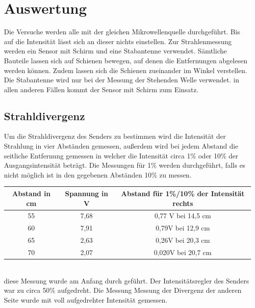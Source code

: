 \newpage
\section{Auswertung}
Die Versuche werden alle mit der gleichen Mikrowellenquelle durchgeführt. Bis auf die Intensität lässt sich an dieser nichts einstellen. Zur Strahlenmessung werden ein Sensor mit Schirm und eine Stabantenne verwendet. Sämtliche Bauteile lassen sich auf Schienen bewegen, auf denen die Entfernungen abgelesen werden können. Zudem lassen sich die Schienen zueinander im Winkel verstellen. Die Stabantenne wird nur bei der Messung der Stehenden Welle verwendet. in allen anderen Fällen kommt der Sensor mit Schirm zum Einsatz.
\subsection{Strahldivergenz}
Um die Strahldivergenz des Senders zu bestimmen wird die Intensität der Strahlung in vier Abständen gemessen, außerdem wird bei jedem Abstand die seitliche Entfernung gemessen in welcher die Intensität circa 1\% oder 10\% der Ausgangsintensität beträgt. 
Die Messungen für 1\% werden durchgeführt, falls es nicht möglich ist in den gegebenen Abständen 10\% zu messen.


\begin{tabular}{|c|c|c|}
\hline 
Abstand in cm & Spannung in V & Abstand für 1\%/10\% der Intensität rechts \\ 
\hline 
55 & 7,68 & 0,77 V bei 14,5 cm \\ 
\hline 
60 & 7,91 & 0,79V bei 12,9 cm \\ 
\hline 
65 & 2,63 & 0,26V bei 20,3 cm \\ 
\hline 
70 & 2,07 & 0,020V bei 20,7 cm \\ 
\hline 
\end{tabular} \\
diese Messung wurde am Anfang durch geführt. Der Intensitätsregler des Senders war zu circa 50\% aufgedreht. 
Die Messung Messung der Divergenz der anderen Seite wurde mit voll aufgedrehter Intensität gemessen.



